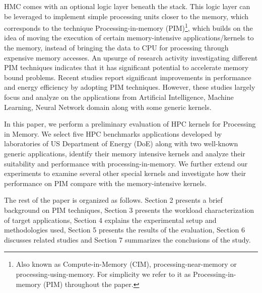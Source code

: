HMC comes with an optional logic layer beneath the stack. This logic layer can be leveraged to implement simple processing units closer to the memory, which corresponds to the technique Processing-in-memory (PIM)\footnote{Also known as Compute-in-Memory (CIM), processing-near-memory or processing-using-memory. For simplicity we refer to it as Processing-in-memory (PIM) throughout the paper.}, which builds on the idea of moving the execution of certain memory-intensive applications/kernels to the memory, instead of bringing the data to CPU for processing through expensive memory accesses. An upsurge of research activity investigating different PIM techniques indicates that it has significant potential to accelerate memory bound problems. Recent studies report significant improvements in performance and energy efficiency by adopting PIM techniques. However, these studies largely focus and analyze on the applications from Artificial Intelligence, Machine Learning, Neural Network domain along with some generic kernels. 

In this paper, we perform a preliminary evaluation of HPC kernels for Processing in Memory. We select five HPC benchmarks applications developed by laboratories of US Department of Energy (DoE) along with two well-known generic applications, identify their memory intensive kernels and analyze their suitability and performance with processing-in-memory. We further extend our experiments to examine several other special kernels and investigate how their performance on PIM compare with the memory-intensive kernels.   

The rest of the paper is organized as follows. Section 2 presents a brief background on PIM techniques, Section 3 presents the workload characterization of target applications, Section 4 explains the experimental setup and methodologies used, Section 5 presents the results of the evaluation, Section 6 discusses related studies and Section 7 summarizes the conclusions of the study.   
